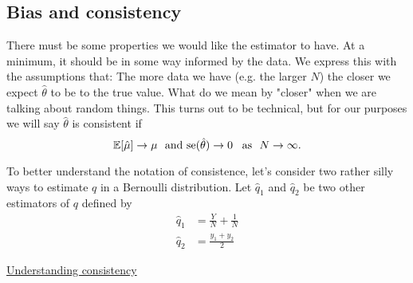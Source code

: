 %
%



\subsection{Bias and consistency}


There must be some properties we would like the estimator to have. At a minimum, it should be in some way informed by the data.  We express this with the assumptions that: The more data we have (e.g. the larger $N$) the closer we expect $\hat{\theta}$ to be to the true value. What do we mean by "closer" when we are talking about random things. This turns out to be technical, but for our purposes we will say $\hat{\theta}$ is {\dfn consistent} if 
\begin{equation}
\mathbb E[\hat{\mu}] \to \mu\,\,\text{ and } {\rm se}(\hat{\theta})  \to 0 \,\,\,\text{ as }\,\, N\to \infty. 
\end{equation}


To better understand the notation of consistence, let's consider two rather silly ways to estimate $q$ in a Bernoulli distribution. Let $\hat{q}_1$ and $\hat{q}_2$ be two other estimators of $q$ defined by 
\begin{align}
\hat{q}_{1} &= \frac{Y}{N} + \frac{1}{N}\\
\hat{q}_{2} &= \frac{y_1 + y_2}{2}
\end{align}

\begin{example}
 \href{https://colab.research.google.com/drive/1QarJhwPmSqCTQ-HwU_lXCUX6uvdhLdrM#scrollTo=US27cD1JgXn_&line=3&uniqifier=1}{Understanding consistency}
\end{example} 

